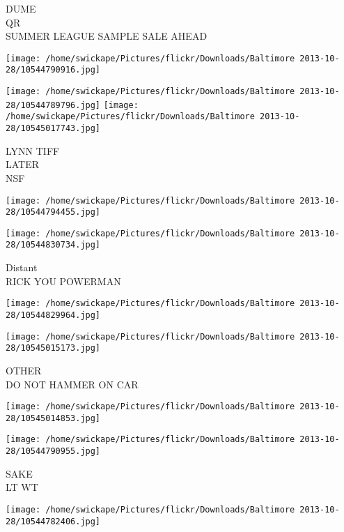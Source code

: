 \documentclass[10pt,letterpaper]{article}
\begin{document}
DUME\\
QR\\
SUMMER LEAGUE SAMPLE SALE AHEAD\\
\pagebreak

\texttt{[image: /home/swickape/Pictures/flickr/Downloads/Baltimore 2013-10-28/10544790916.jpg]}

\vspace{0.25in}
\texttt{[image: /home/swickape/Pictures/flickr/Downloads/Baltimore 2013-10-28/10544789796.jpg]}
\texttt{[image: /home/swickape/Pictures/flickr/Downloads/Baltimore 2013-10-28/10545017743.jpg]}

LYNN TIFF\\
LATER\\
NSF\\
\pagebreak

\texttt{[image: /home/swickape/Pictures/flickr/Downloads/Baltimore 2013-10-28/10544794455.jpg]}

\vspace{0.25in}
\texttt{[image: /home/swickape/Pictures/flickr/Downloads/Baltimore 2013-10-28/10544830734.jpg]}

Distant\\
RICK YOU POWERMAN\\
\pagebreak

\texttt{[image: /home/swickape/Pictures/flickr/Downloads/Baltimore 2013-10-28/10544829964.jpg]}

\vspace{0.25in}
\texttt{[image: /home/swickape/Pictures/flickr/Downloads/Baltimore 2013-10-28/10545015173.jpg]}

OTHER\\
DO NOT HAMMER ON CAR\\
\pagebreak

\texttt{[image: /home/swickape/Pictures/flickr/Downloads/Baltimore 2013-10-28/10545014853.jpg]}

\vspace{0.25in}
\texttt{[image: /home/swickape/Pictures/flickr/Downloads/Baltimore 2013-10-28/10544790955.jpg]}

SAKE\\
LT WT\\
\pagebreak

\texttt{[image: /home/swickape/Pictures/flickr/Downloads/Baltimore 2013-10-28/10544782406.jpg]}
\end{document}
